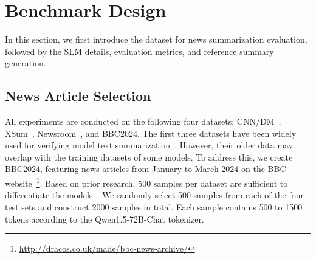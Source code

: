 

\section{Benchmark Design}\label{sec:setup}


In this section, we first introduce the dataset for news summarization evaluation, followed by the SLM details, evaluation metrics, and reference summary generation.

\subsection{News Article Selection }

All experiments are conducted on the following four datasets: CNN/DM~\cite{cnndm}, XSum~\cite{xsum}, Newsroom~\cite{newsroom}, and BBC2024. The first three datasets have been widely used for verifying model text summarization~\cite{goyal2022news,google-2023-benchmarking,zhang2024benchmarking}. However, their older data may overlap with the training datasets of some models. To address this, we create BBC2024, featuring news articles from January to March 2024 on the BBC website~\footnote{\url{http://dracos.co.uk/made/bbc-news-archive/}}. Based on prior research, 500 samples per dataset are sufficient to differentiate the models~\cite{google-2023-benchmarking}. We randomly select 500 samples from each of the four test sets and construct 2000 samples in total. Each sample contains 500 to 1500 tokens according to the Qwen1.5-72B-Chat tokenizer.



